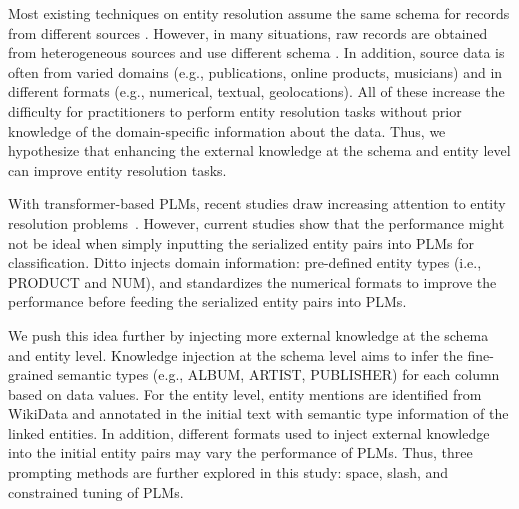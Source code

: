 Most existing techniques on entity resolution assume the same schema for records from different sources \cite{elmagarmid_duplicate_2007}. However, in many situations, raw records are obtained from heterogeneous sources and use different schema \cite{enriquez_entity_2017, arabnia_when_2021}. In addition, source data is often from varied domains (e.g., publications, online products, musicians) and in different formats (e.g., numerical, textual, geolocations). 
All of these increase the difficulty for practitioners to perform entity resolution tasks without prior knowledge of the domain-specific information about the data.
Thus, we hypothesize that enhancing the external knowledge at the schema and entity level can improve entity resolution tasks.  

With transformer-based PLMs, recent studies draw increasing attention to entity resolution problems~\cite{li_deep_2020, trabelsi_dame_2022}. However, current studies show that the performance might not be ideal when simply inputting the serialized entity pairs into PLMs for classification. Ditto \cite{li_deep_2020} injects domain information: pre-defined entity types (i.e., PRODUCT and NUM), and standardizes the numerical formats to improve the performance before feeding the serialized entity pairs into PLMs.

We push this idea further by injecting more external knowledge at the schema and entity level. Knowledge injection at the schema level aims to infer the fine-grained semantic types (e.g., ALBUM, ARTIST, PUBLISHER) for each column based on data values. 
For the entity level, entity mentions are identified from WikiData and annotated in the initial text with semantic type information of the linked entities. In addition, different formats used to inject external knowledge into the initial entity pairs may vary the performance of PLMs. Thus, three prompting methods are further explored in this study: space, slash, and constrained tuning of PLMs.

